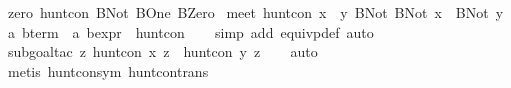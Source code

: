 \begin{isabellebody}
{}\ zero{}\ {}hunt{}con\ {}BNot\ BOne{}\ BZero{}\isanewline
{}\ meet{}\ {}hunt{}con\ {}x\ {}{}{}\ y{}\ {}BNot\ {}BNot\ x\ {}{}{}\ BNot\ y{}{}{}\isanewline
\isanewline
{}\isamarkupfalse%
\ {}a\ bterm\ {}\ {}{}a\ bexpr{}\ {}\ {}hunt{}con{}\isanewline
%
\isadelimproof
\ \ %
\endisadelimproof
%
\isatagproof
{}\isamarkupfalse%
\ {}simp\ add{}\ equivp{}def{}\ auto{}\isanewline
\ \ \isamarkupfalse%
\ {}subgoal{}tac\ {}{}z{}\ hunt{}con\ x\ z\ {}\ hunt{}con\ y\ z{}{}\isanewline
\ \ \isamarkupfalse%
\ auto\isanewline
\ \ \isamarkupfalse%
\ {}metis\ hunt{}con{}sym\ hunt{}con{}trans{}{}%
\endisatagproof

\end{isabellebody}

